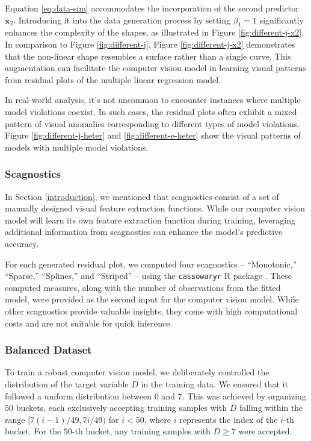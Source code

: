 \documentclass[]{interact}
\theoremstyle{plain}%
\theoremstyle{definition}
\theoremstyle{remark}
\begin{document}
Equation \ref{eq:data-sim} accommodates the incorporation of the second
predictor \(\boldsymbol{x}_2\). Introducing it into the data generation
process by setting \(\beta_1 = 1\) significantly enhances the complexity
of the shapes, as illustrated in Figure \ref{fig:different-j-x2}. In
comparison to Figure \ref{fig:different-j}, Figure
\ref{fig:different-j-x2} demonstrates that the non-linear shape
resembles a surface rather than a single curve. This augmentation can
facilitate the computer vision model in learning visual patterns from
residual plots of the multiple linear regression model.

In real-world analysis, it's not uncommon to encounter instances where
multiple model violations coexist. In such cases, the residual plots
often exhibit a mixed pattern of visual anomalies corresponding to
different types of model violations. Figure \ref{fig:different-j-heter}
and \ref{fig:different-e-heter} show the visual patterns of models with
multiple model violations.

\subsubsection{Scagnostics}\label{scagnostics}

In Section \ref{introduction}, we mentioned that scagnostics consist of
a set of manually designed visual feature extraction functions. While
our computer vision model will learn its own feature extraction function
during training, leveraging additional information from scagnostics can
enhance the model's predictive accuracy.

For each generated residual plot, we computed four scagnostics --
``Monotonic,'' ``Sparse,'' ``Splines,'' and ``Striped'' -- using the
\texttt{cassowaryr} R package \citep{mason2022cassowaryr}. These
computed measures, along with the number of observations from the fitted
model, were provided as the second input for the computer vision model.
While other scagnostics provide valuable insights, they come with high
computational costs and are not suitable for quick inference.

\subsubsection{Balanced Dataset}\label{balanced-dataset}

To train a robust computer vision model, we deliberately controlled the
distribution of the target variable \(D\) in the training data. We
ensured that it followed a uniform distribution between \(0\) and \(7\).
This was achieved by organizing \(50\) buckets, each exclusively
accepting training samples with \(D\) falling within the range
\([7(i - 1)/49, 7i/49)\) for \(i < 50\), where \(i\) represents the
index of the \(i\)-th bucket. For the \(50\)-th bucket, any training
samples with \(D \geq 7\) were accepted.
\end{document}
